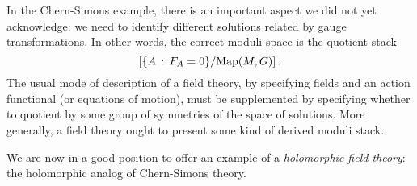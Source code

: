 \documentclass[11pt]{amsart}
\def\del{\partial}
\begin{document}
\begin{rmk}
In the Chern-Simons example, there is an important aspect we did not yet acknowledge:
we need to identify different solutions related by gauge transformations.
In other words, the correct moduli space is the quotient stack
\[
\left[ \{ A \,:\, F_A = 0\}/{\rm Map}(M,G) \right].
\]
The usual mode of description of a field theory, by specifying fields and an action functional (or equations of motion), 
must be supplemented by specifying whether to quotient by some group of symmetries of the space of solutions.
More generally, a field theory ought to present some kind of derived moduli stack.
\end{rmk}

We are now in a good position to offer an example of a {\em holomorphic field theory}:
the holomorphic analog of Chern-Simons theory.
 
%
\end{document}
